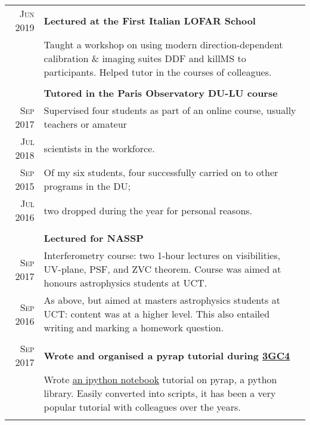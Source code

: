 \documentclass[10pt]{article} %
\begin{document}
\begin{tabular}{r|p{12.5cm}}
	\textsc{Jun 2019} & \textbf{Lectured at the First Italian LOFAR School}\vspace{1mm}\\
	& Taught a workshop on using modern direction-dependent calibration \& imaging
	suites DDF and killMS to participants. Helped tutor in the courses of colleagues.\\
	\multicolumn{2}{c}{} \\
	
	& \textbf{Tutored in the Paris Observatory DU-LU course}	\vspace{1mm}\\
	\textsc{Sep 2017} & Supervised four students as part of an online course, usually teachers or amateur\\
	\textsc{Jul 2018} & scientists in the workforce.\vspace{1mm}\\
	\textsc{Sep 2015} &Of my six students, four successfully carried on to other programs in the DU;\\
	\textsc{Jul 2016} & two dropped during the year for personal reasons.\\
	\multicolumn{2}{c}{} \\

	& \textbf{Lectured for NASSP}\vspace{1mm}\\
	\textsc{Sep 2017} & Interferometry course: two 1-hour lectures on visibilities, UV-plane, PSF, and
	ZVC theorem. Course was aimed at honours astrophysics students at UCT.\vspace{1mm}\\
	\textsc{Sep 2016} & As above, but aimed at masters astrophysics students at UCT: content was at a
	higher level. This also entailed writing and marking a homework question.\\
	\multicolumn{2}{c}{} \\
	

	\textsc{Sep 2017} & \textbf{Wrote and organised a pyrap tutorial during \hyperlink{http://www.ast.uct.ac.za/3gc4hifidelity/}{3GC4}}\\
	& Wrote \hyperlink{https://github.com/ebonnassieux/Scripts/blob/master/PyrapTutorial.ipynb}{an ipython notebook} tutorial on pyrap, a python library. Easily converted into scripts, it has been a very popular tutorial with colleagues over the years.\\
	\multicolumn{2}{c}{} \\


\end{tabular}
\end{document}
